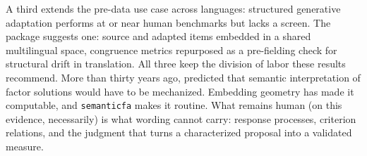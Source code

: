 A third extends the pre-data use case across languages: structured
generative adaptation performs at or near human benchmarks
\citep{grobelny-etal-2025} but lacks a screen. The package suggests
one: source and adapted items embedded in a shared multilingual
space, congruence metrics repurposed as a pre-fielding check for
structural drift in translation. All three keep the division of labor
these results recommend. More than thirty years ago,
\citet{lara-etal-1992} predicted that semantic interpretation of factor
solutions would have to be mechanized. Embedding geometry has made it
computable, and \texttt{semanticfa} makes it routine. What remains
human (on this evidence, necessarily) is what wording cannot
carry: response processes, criterion relations, and the judgment that
turns a characterized proposal into a validated measure.
